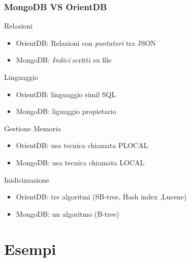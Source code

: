 \documentclass{beamer}
\begin{document}
\begin{frame}
\frametitle{MongoDB VS OrientDB}

\begin{block}{Relazioni}
\begin{itemize}
\item OrientDB: Relazioni con \emph{puntatori} tra JSON
\item MongoDB: \emph{Indici} scritti su file
\end{itemize}
\end{block}

\begin{block}{Linguaggio}
\begin{itemize}
\item OrientDB: linguaggio simil SQL
\item MongoDB: liguaggio propietario 
\end{itemize}
\end{block}

\begin{block}{Gestione Memoria}
\begin{itemize}
\item OrientDB: usa tecnica chiamata PLOCAL
\item MongoDB:  usa tecnica chiamata LOCAL
\end{itemize}
\end{block}

\begin{block}{Inidicizzazione}
\begin{itemize}
\item OrientDB: tre algoritmi (SB-tree, Hash index ,Lucene)
\item MongoDB:  un algoritmo (B-tree)
\end{itemize}
\end{block}

\end{frame}


\section{Esempi}
\end{document}
